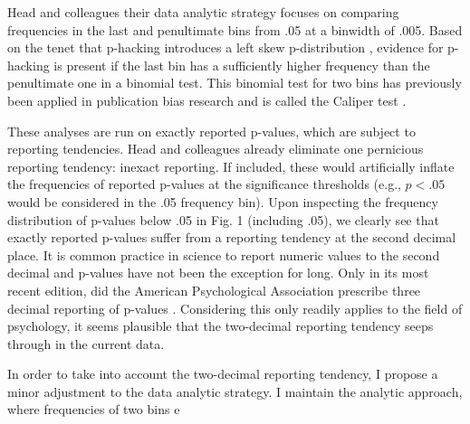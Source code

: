Head and colleagues their data analytic strategy focuses on comparing frequencies in the last and penultimate bins from .05 at a binwidth of .005. Based on the tenet that p-hacking introduces a left skew p-distribution \cite{Simonsohn2014}, evidence for p-hacking is present if the last bin has a sufficiently higher frequency than the penultimate one in a binomial test. This binomial test for two bins has previously been applied in publication bias research and is called the Caliper test \cite{gerber2010, kuhberger2014}.

These analyses are run on exactly reported p-values, which are subject to reporting tendencies. Head and colleagues already eliminate one pernicious reporting tendency: inexact reporting. If included, these would artificially inflate the frequencies of reported p-values at the significance thresholds (e.g., $p<.05$ would be considered in the .05 frequency bin). Upon inspecting the frequency distribution of p-values below .05 in Fig. 1 (including .05), we clearly see that exactly reported p-values suffer from a reporting tendency at the second decimal place. It is common practice in science to report numeric values to the second decimal and p-values have not been the exception for long. Only in its most recent edition, did the American Psychological Association prescribe three decimal reporting of p-values \cite{AmericanPsychologicalAssociation2010}. Considering this only readily applies to the field of psychology, it seems plausible that the two-decimal reporting tendency seeps through in the current data. 

In order to take into account the two-decimal reporting tendency, I propose a minor adjustment to the data analytic strategy. I maintain the analytic approach, where frequencies of two bins e